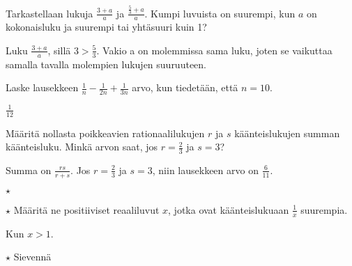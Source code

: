 \begin{tehtavasivu}
\begin{tehtava}
 Tarkastellaan lukuja $\frac{3+a}{a}$ ja $\frac{\frac{5}{3}+a}{a}$. Kumpi luvuista on suurempi, kun \(a\) on kokonaisluku ja suurempi tai yhtäsuuri kuin 1?
 \begin{vastaus}
  Luku $\frac{3+a}{a}$, sillä $3>\frac{5}{3}$. Vakio a on molemmissa sama luku, joten se vaikuttaa samalla tavalla molempien lukujen suuruuteen.
 \end{vastaus}
\end{tehtava}

\begin{tehtava}
	Laske lausekkeen $\frac{1}{n}-\frac{1}{2n}+\frac{1}{3n}$ arvo, kun tiedetään, että $n = 10$.
	\begin{vastaus}
		$\frac{1}{12}$
	\end{vastaus}
\end{tehtava}
\begin{tehtava}
	Määritä nollasta poikkeavien rationaalilukujen \(r\) ja \(s\) käänteislukujen summan käänteisluku. Minkä arvon saat, jos \(r=\frac{2}{3}\) ja \(s=3\)?
	\begin{vastaus}
		Summa on $\frac{rs}{r+s}$. Jos \(r=\frac{2}{3}\) ja \(s=3\), niin lausekkeen arvo on \(\frac{6}{11}\).
	\end{vastaus}
\end{tehtava}

\begin{tehtava} $\star$ 
	\begin{vastaus}
	\end{vastaus}
\end{tehtava}

\begin{tehtava} $\star$
	Määritä ne positiiviset reaaliluvut $x$, jotka ovat käänteislukuaan $\frac{1}{x}$ suurempia.
	\begin{vastaus}
	 Kun $x>1$.
	\end{vastaus}
\end{tehtava}

\begin{tehtava} $\star $
Sievennä
 \begin{vastaus}
	\alakohdat{
		§ $a+1$
		§ $4a$
	}
 \end{vastaus}
\end{tehtava}


\end{tehtavasivu}
